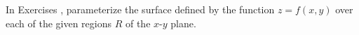 {\noindent In Exercises}
{, parameterize the surface defined by the function $z=f(x,y)$ over each of the given regions $R$ of the $x$-$y$ plane.
}
